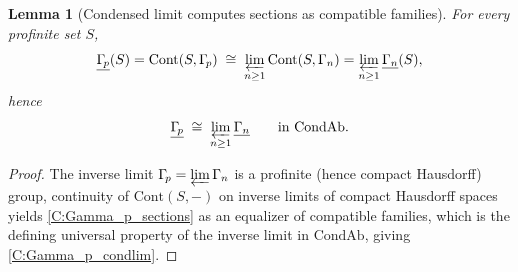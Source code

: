 \documentclass[11pt]{article}
\newtheorem{lemma}[theorem]{Lemma}
\theoremstyle{remark}
\begin{document}
\begin{lemma}[Condensed limit computes sections as compatible families]
For every profinite set $S$,
\begin{equation}
\underline{\Gamma_{\!p}}(S)
=
\mathrm{Cont}(S,\Gamma_{\!p})
\;\cong\;
\varprojlim_{n\ge 1}\mathrm{Cont}(S,\Gamma_{n})
=
\varprojlim_{n\ge 1}\underline{\Gamma_{n}}(S),
\label{C:Gamma_p_sections}
\end{equation}
hence
\begin{equation}
\underline{\Gamma_{\!p}}\;\cong\;\varprojlim_{n\ge 1}\underline{\Gamma_{n}}
\qquad \text{in }\mathrm{CondAb}.
\label{C:Gamma_p_condlim}
\end{equation}
\end{lemma}

\begin{proof}
The inverse limit $\Gamma_{\!p}=\varprojlim \Gamma_n$ is a profinite (hence compact Hausdorff) group, continuity of $\mathrm{Cont}(S,-)$ on inverse limits of compact Hausdorff spaces yields \eqref{C:Gamma_p_sections} as an equalizer of compatible families, which is the defining universal property of the inverse limit in $\mathrm{CondAb}$, giving \eqref{C:Gamma_p_condlim}.
\end{proof}
\end{document}

